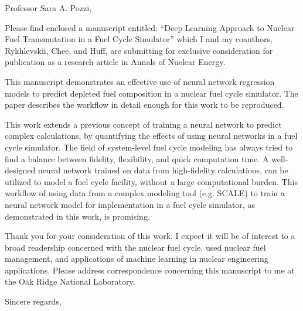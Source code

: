 \documentclass[11pt]{letter} %
\begin{document}

\begin{letter}{}


\address{Jin Whan Bae\\
nuclearbae@gmail.com\\
1 Bethel Valley Rd.\\
Oak Ridge, TN 37830}



\opening{Professor Sara A. Pozzi,}

Please find enclosed a manuscript entitled: ``Deep Learning Approach to Nuclear Fuel Transmutation in a Fuel
Cycle Simulator'' which I and my coauthors, Rykhlevskii, Chee, and Huff, 
are submitting for exclusive consideration for publication as a research 
article in Annals of Nuclear Energy.

This manuscript demonstrates an effective use of neural network regression
models to predict depleted fuel composition in a nuclear fuel cycle
simulator. The paper describes the workflow in detail enough for this
work to be reproduced.

This work extends a previous concept of training a neural network to
predict complex calculations, by quantifying the effects of using
neural networks in a fuel cycle simulator. The field of system-level
fuel cycle modeling has always tried to find a balance between
fidelity, flexibility, and quick computation time. A well-designed
neural network trained on data from high-fidelity calculations, can
be utilized to model a fuel cycle facility, without a large
computational burden. This workflow of using data from a complex
modeling tool (e.g. SCALE) to train a neural network model 
for implementation in a fuel cycle simulator, as demonstrated in
this work, is promising.


Thank you for your consideration of this work. I expect it will be of interest
to a broad readership concerned with the nuclear fuel cycle, used
nuclear fuel management, and applications of machine learning in nuclear engineering applications.  Please address correspondence concerning
this manuscript to me at the Oak Ridge National Laboratory.

\closing{Sincere regards,
}


\end{letter}
\end{document}
